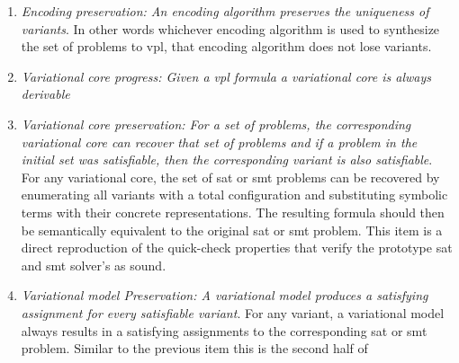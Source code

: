 \begin{enumerate}
\item \emph{Encoding preservation: An encoding algorithm preserves the
    uniqueness of variants}. In other words whichever encoding algorithm is used
  to synthesize the set of problems to \ac{vpl}, that encoding algorithm does
  not lose variants.
\item \emph{Variational core progress: Given a \ac{vpl} formula a variational
    core is always derivable}
\item \emph{Variational core preservation: For a set of \pl{} problems, the
    corresponding variational core can recover that set of problems and if a
    problem in the initial set was satisfiable, then the corresponding variant
    is also satisfiable}. For any variational core, the set of \ac{sat} or
  \ac{smt} problems can be recovered by enumerating all variants with a total
  configuration and substituting symbolic terms with their concrete
  representations. The resulting formula should then be semantically equivalent
  to the original \ac{sat} or \ac{smt} problem. This item is a direct
  reproduction of the quick-check properties that verify the prototype \ac{sat}
  and \ac{smt} solver's as sound.
\item \emph{Variational model Preservation: A variational model produces a
    satisfying assignment for every satisfiable variant}. For any variant, a
  variational model always results in a satisfying assignments to the
  corresponding \ac{sat} or \ac{smt} problem. Similar to the previous item this
  is the second half of
\end{enumerate}


